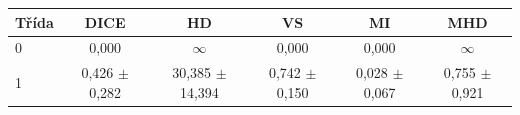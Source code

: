 \begin{tabular}{l c c c c c}
 \hline
Třída & DICE & HD & VS & MI & MHD \\ \hline
0 & 0,000 & $\infty$ & 0,000 & 0,000 & $\infty$ \\
1 & 0,426 $\pm$ 0,282 & 30,385 $\pm$ 14,394 & 0,742 $\pm$ 0,150 & 0,028 $\pm$ 0,067 & 0,755 $\pm$ 0,921 \\
\hline 
 \end{tabular}
